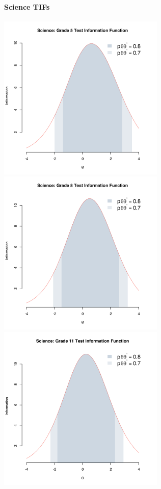 \documentclass[]{article}
\let\oldparagraph\paragraph
\renewcommand{\paragraph}[1]{\oldparagraph{#1}\mbox{}}
\begin{document}
\paragraph{Science TIFs}\label{science-tifs}

\FloatBarrier
\includegraphics[height=3.12500in]{tifs/science5tif.pdf}
\includegraphics[height=3.12500in]{tifs/science8tif.pdf}
\includegraphics[height=3.12500in]{tifs/science11tif.pdf}
\end{document}

